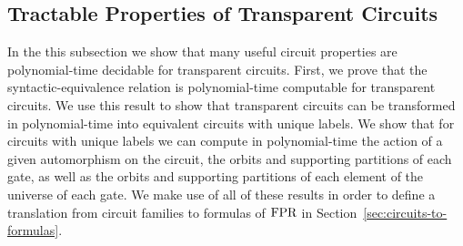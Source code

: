 \documentclass[../paper.tex]{subfiles}
\begin{document}
\subsection{Tractable Properties of Transparent Circuits}
In the this subsection we show that many useful circuit properties are
polynomial-time decidable for transparent circuits. First, we prove that the
syntactic-equivalence relation is polynomial-time computable for transparent
circuits. We use this result to show that transparent circuits can be
transformed in polynomial-time into equivalent circuits with unique labels. We
show that for circuits with unique labels we can compute in polynomial-time the
action of a given automorphism on the circuit, the orbits and supporting
partitions of each gate, as well as the orbits and supporting partitions of each
element of the universe of each gate. We make use of all of these results in
order to define a translation from circuit families to formulas of $\text{\upshape FPR}$ in
Section~\ref{sec:circuits-to-formulas}.





\end{document}
